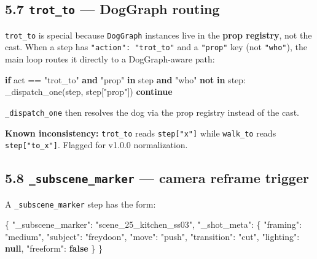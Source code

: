 \documentclass[
  12pt,
  letterpaper,
]{book}
\newenvironment{Shaded}{}{}
\newcommand{\ControlFlowTok}[1]{\textcolor[rgb]{0.00,0.44,0.13}{\textbf{#1}}}
\newcommand{\DataTypeTok}[1]{\textcolor[rgb]{0.56,0.13,0.00}{#1}}
\newcommand{\FunctionTok}[1]{\textcolor[rgb]{0.02,0.16,0.49}{#1}}
\newcommand{\KeywordTok}[1]{\textcolor[rgb]{0.00,0.44,0.13}{\textbf{#1}}}
\newcommand{\NormalTok}[1]{#1}
\newcommand{\OperatorTok}[1]{\textcolor[rgb]{0.40,0.40,0.40}{#1}}
\newcommand{\StringTok}[1]{\textcolor[rgb]{0.25,0.44,0.63}{#1}}
\begin{document}
\subsection{\texorpdfstring{5.7 \texttt{trot\_to} --- DogGraph
routing}{5.7 trot\_to --- DogGraph routing}}\label{trot_to-doggraph-routing}

\texttt{trot\_to} is special because \texttt{DogGraph} instances live in
the \textbf{prop registry}, not the cast. When a step has
\texttt{"action":\ "trot\_to"} and a \texttt{"prop"} key (not
\texttt{"who"}), the main loop routes it directly to a DogGraph-aware
path:

\begin{Shaded}
\begin{Highlighting}[]
\ControlFlowTok{if}\NormalTok{ act }\OperatorTok{==} \StringTok{"trot\_to"} \KeywordTok{and} \StringTok{"prop"} \KeywordTok{in}\NormalTok{ step }\KeywordTok{and} \StringTok{"who"} \KeywordTok{not} \KeywordTok{in}\NormalTok{ step:}
\NormalTok{    \_dispatch\_one(step, step[}\StringTok{"prop"}\NormalTok{])}
    \ControlFlowTok{continue}
\end{Highlighting}
\end{Shaded}

\texttt{\_dispatch\_one} then resolves the dog via the prop registry
instead of the cast.

\textbf{Known inconsistency:} \texttt{trot\_to} reads
\texttt{step{[}"x"{]}} while \texttt{walk\_to} reads
\texttt{step{[}"to\_x"{]}}. Flagged for v1.0.0 normalization.

\subsection{\texorpdfstring{5.8 \texttt{\_subscene\_marker} --- camera
reframe
trigger}{5.8 \_subscene\_marker --- camera reframe trigger}}\label{subscene_marker-camera-reframe-trigger}

A \texttt{\_subscene\_marker} step has the form:

\begin{Shaded}
\begin{Highlighting}[]
\FunctionTok{\{}
  \DataTypeTok{"\_subscene\_marker"}\FunctionTok{:} \StringTok{"scene\_25\_kitchen\_ss03"}\FunctionTok{,}
  \DataTypeTok{"\_shot\_meta"}\FunctionTok{:} \FunctionTok{\{}
    \DataTypeTok{"framing"}\FunctionTok{:}    \StringTok{"medium"}\FunctionTok{,}
    \DataTypeTok{"subject"}\FunctionTok{:}    \StringTok{"freydoon"}\FunctionTok{,}
    \DataTypeTok{"move"}\FunctionTok{:}       \StringTok{"push"}\FunctionTok{,}
    \DataTypeTok{"transition"}\FunctionTok{:} \StringTok{"cut"}\FunctionTok{,}
    \DataTypeTok{"lighting"}\FunctionTok{:}   \KeywordTok{null}\FunctionTok{,}
    \DataTypeTok{"freeform"}\FunctionTok{:}   \KeywordTok{false}
  \FunctionTok{\}}
\FunctionTok{\}}
\end{Highlighting}
\end{Shaded}
\end{document}
